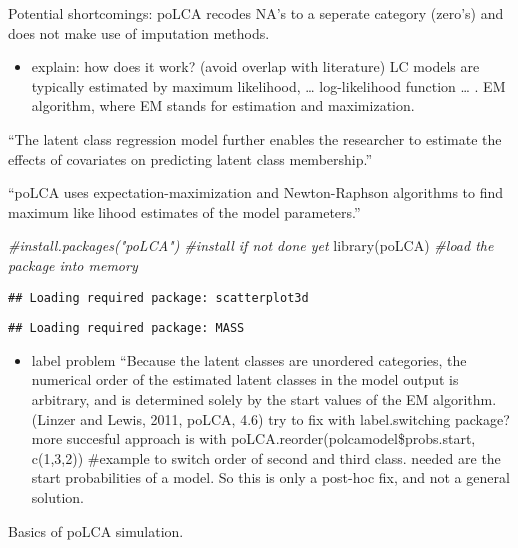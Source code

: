 \documentclass[
]{article}
\newenvironment{Shaded}{\begin{snugshade}}{\end{snugshade}}
\newcommand{\CommentTok}[1]{\textcolor[rgb]{0.56,0.35,0.01}{\textit{#1}}}
\newcommand{\FunctionTok}[1]{\textcolor[rgb]{0.00,0.00,0.00}{#1}}
\newcommand{\NormalTok}[1]{#1}
\providecommand{\tightlist}{%
  \setlength{\itemsep}{0pt}\setlength{\parskip}{0pt}}
\begin{document}
Potential shortcomings: poLCA recodes NA's to a seperate category
(zero's) and does not make use of imputation methods.

\begin{itemize}
\tightlist
\item
  explain: how does it work? (avoid overlap with literature) LC models
  are typically estimated by maximum likelihood, \ldots{} log-likelihood
  function \ldots{} . EM algorithm, where EM stands for estimation and
  maximization.
\end{itemize}

``The latent class regression model further enables the researcher to
estimate the effects of covariates on predicting latent class
membership.''

``poLCA uses expectation-maximization and Newton-Raphson algorithms to
find maximum likelihood estimates of the model parameters.''

\begin{Shaded}
\begin{Highlighting}[]
\CommentTok{\#install.packages("poLCA") \#install if not done yet}
\FunctionTok{library}\NormalTok{(poLCA) }\CommentTok{\#load the package into memory}
\end{Highlighting}
\end{Shaded}

\begin{verbatim}
## Loading required package: scatterplot3d
\end{verbatim}

\begin{verbatim}
## Loading required package: MASS
\end{verbatim}

\begin{itemize}
\tightlist
\item
  label problem ``Because the latent classes are unordered categories,
  the numerical order of the estimated latent classes in the model
  output is arbitrary, and is determined solely by the start values of
  the EM algorithm. (Linzer and Lewis, 2011, poLCA, 4.6) try to fix with
  label.switching package? more succesful approach is with
  poLCA.reorder(polcamodel\$probs.start, c(1,3,2)) \#example to switch
  order of second and third class. needed are the start probabilities of
  a model. So this is only a post-hoc fix, and not a general solution.
\end{itemize}

Basics of poLCA simulation.
\end{document}
